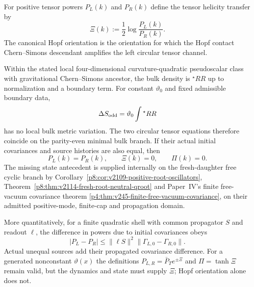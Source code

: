 \documentclass[12pt,a4paper]{article}
\begin{document}
\begin{definition}
\label{p8:def:deferred-hopf-cs-transfer}
For positive tensor powers $P_L(k)$ and $P_R(k)$ define the tensor helicity transfer by
\begin{equation}
\label{p8:eq:Xi-helicity-transfer}
\Xi(k):=\frac12\log\frac{P_L(k)}{P_R(k)}.
\end{equation}
The canonical Hopf orientation is the orientation for which the Hopf contact Chern--Simons descendant amplifies the left circular tensor channel.
\end{definition}

\begin{theorem}
\label{p8:thm:parity-odd-coefficient}
\label{p8:thm:hopf-reeb-spectral-flow-xi-delta}
Within the stated local four-dimensional curvature-quadratic pseudoscalar
class with gravitational Chern--Simons ancestor, the bulk density is
${}^\star RR$ up to normalization and a boundary term. For constant
$\vartheta_0$ and fixed admissible boundary data,
\begin{equation}
\label{p8:eq:minimal-odd-topological-action}
 \Delta S_{\rm odd}=\vartheta_0\int{}^\star RR
\end{equation}
has no local bulk metric variation. The two circular tensor equations
therefore coincide on the parity-even minimal bulk branch. If their
actual initial covariances and source histories are also equal, then
\begin{equation}
\label{p8:eq:cs-transfer-delta}
 \boxed{P_L(k)=P_R(k),\qquad\Xi(k)=0,\qquad\Pi(k)=0.}
\end{equation}
The missing state antecedent is supplied internally on the fresh-daughter
free cyclic branch by
Corollary~\ref{p8:cor:v2109-positive-root-oscillators},
Theorem~\ref{p8:thm:v2114-fresh-root-neutral-qroot} and
Paper~IV's finite free-vacuum covariance theorem
\ref{p4:thm:v245-finite-free-vacuum-covariance}, on their admitted
positive-mode, finite-cap and propagation domain.

More quantitatively, for a finite quadratic shell with common propagator
$S$ and readout $\ell$, the difference in powers due to initial covariances
obeys
\[
 |P_L-P_R|\le\|\ell S\|^2\|\Gamma_{L,0}-\Gamma_{R,0}\|.
\]
Actual unequal sources add their propagated covariance difference.
For a generated nonconstant $\vartheta(x)$ the definitions
$P_{L,R}=\bar P_T e^{\pm\Xi}$ and $\Pi=\tanh\Xi$ remain valid, but
the dynamics and state must supply $\Xi$; Hopf orientation alone does not.
\end{theorem}
\end{document}

